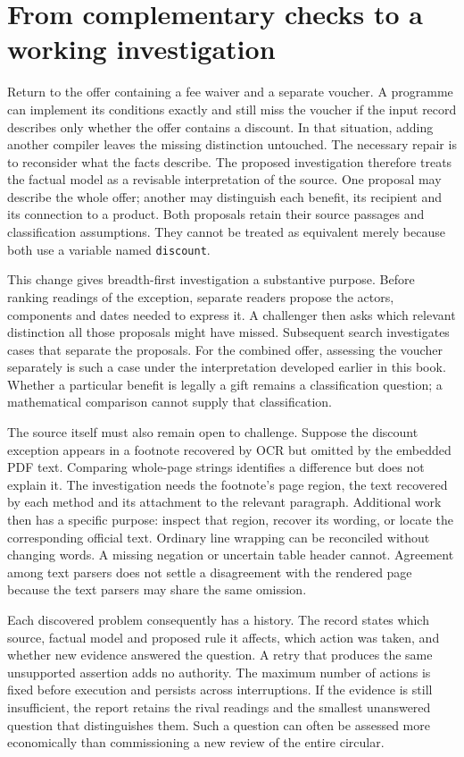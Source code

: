 \section{From complementary checks to a working investigation}
\label{sec:integrated-investigation}

Return to the offer containing a fee waiver and a separate voucher. A programme
can implement its conditions exactly and still miss the voucher if the input
record describes only whether the offer contains a discount. In that situation,
adding another compiler leaves the missing distinction untouched. The necessary
repair is to reconsider what the facts describe. The proposed investigation
therefore treats the factual model as a revisable interpretation of the source.
One proposal may describe the whole offer; another may distinguish each benefit,
its recipient and its connection to a product. Both proposals retain their
source passages and classification assumptions. They cannot be treated as
equivalent merely because both use a variable named \texttt{discount}.

This change gives breadth-first investigation a substantive purpose. Before
ranking readings of the exception, separate readers propose the actors,
components and dates needed to express it. A challenger then asks which relevant
distinction all those proposals might have missed. Subsequent search investigates
cases that separate the proposals. For the combined offer, assessing the voucher
separately is such a case under the interpretation developed earlier in this
book. Whether a particular benefit is legally a gift remains a classification
question; a mathematical comparison cannot supply that classification.

The source itself must also remain open to challenge. Suppose the discount
exception appears in a footnote recovered by OCR but omitted by the embedded
PDF text. Comparing whole-page strings identifies a difference but does not
explain it. The investigation needs the footnote's page region, the text recovered
by each method and its attachment to the relevant paragraph. Additional work
then has a specific purpose: inspect that region, recover its wording, or locate
the corresponding official text. Ordinary line wrapping can be reconciled
without changing words. A missing negation or uncertain table header cannot.
Agreement among text parsers does not settle a disagreement with the rendered
page because the text parsers may share the same omission.

Each discovered problem consequently has a history. The record states which
source, factual model and proposed rule it affects, which action was taken,
and whether new evidence answered the question. A retry that produces the same
unsupported assertion adds no authority. The maximum number of actions is fixed
before execution and persists across interruptions. If the evidence is still
insufficient, the report retains the rival readings and the smallest unanswered
question that distinguishes them. Such a question can often be assessed more
economically than commissioning a new review of the entire circular.

